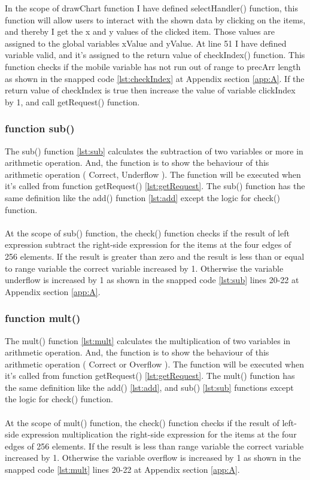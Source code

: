 \documentclass[11pt]{article}
\begin{document}
In the scope of drawChart function I have defined selectHandler() function, this function will allow users to interact with the shown data by clicking on the items, and thereby I get the x and y values of the clicked item. Those values are assigned to the global variables xValue and yValue. At line 51 I have defined variable valid, and it's assigned to the return value of checkIndex() function. This function checks if the mobile variable has not run out of range to precArr length as shown in the snapped code \ref{lst:checkIndex} at Appendix section \ref{app:A}. If the return value of checkIndex is true then increase the value of variable clickIndex by 1, and call getRequest() function.

\subsubsection{function sub()}
The sub() function \ref{lst:sub} calculates the subtraction of two variables or more in arithmetic operation. And, the function is to show the behaviour of this arithmetic operation ( Correct, Underflow ). The function will be executed when it's called from function getRequest() \ref{lst:getRequest}. The sub() function has the same definition like the add() function \ref{lst:add} except the logic for check() function.\\
\\At the scope of sub() function, the check() function checks if the result of left expression subtract the right-side expression for the items at the four edges of 256 elements. If the result is greater than zero and the result is less than or equal to range variable the correct variable increased by 1. Otherwise the variable underflow is increased by 1 as shown in the snapped code \ref{lst:sub} lines 20-22 at Appendix section \ref{app:A}.\\

\subsubsection{function mult()}
The mult() function \ref{lst:mult} calculates the multiplication of two variables in arithmetic operation. And, the function is to show the behaviour of this arithmetic operation ( Correct or Overflow ). The function will be executed when it's called from function getRequest() \ref{lst:getRequest}. The mult() function has the same definition like the add() \ref{lst:add}, and sub() \ref{lst:sub} functions except the logic for check() function.\\
\\At the scope of mult() function, the check() function checks if the result of left-side expression multiplication the right-side expression for the items at the four edges of 256 elements. If the result is less than range variable the correct variable increased by 1. Otherwise the variable overflow is increased by 1 as shown in the snapped code \ref{lst:mult} lines 20-22 at Appendix section \ref{app:A}.\\
\end{document}
